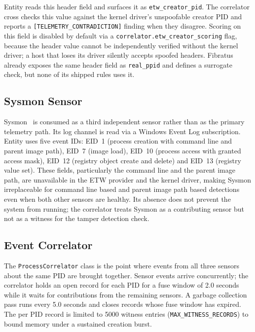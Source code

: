 \documentclass[10pt,twocolumn,letterpaper]{article}
\newcommand{\code}[1]{\texttt{\small #1}}
\begin{document}
Entity reads this header field and surfaces it as \code{etw\_creator\_pid}. The
correlator cross checks this value against the kernel driver's unspoofable creator PID
and reports a \code{[TELEMETRY\_CONTRADICTION]} finding when they disagree. Scoring on
this field is disabled by default via a \code{correlator.etw\_creator\_scoring} flag,
because the header value cannot be independently verified without the kernel driver; a
host that loses its driver silently accepts spoofed headers. Fibratus already exposes the
same header field as \code{real\_ppid} and defines a surrogate check, but none of its
shipped rules uses it.

\subsection{Sysmon Sensor}
\label{sec:sysmon}

Sysmon~\cite{sysmon} is consumed as a third independent sensor rather than as the primary
telemetry path. Its log channel is read via a Windows Event Log subscription. Entity uses
five event IDs: EID~1 (process creation with command line and parent image path), EID~7
(image load), EID~10 (process access with granted access mask), EID~12 (registry object
create and delete) and EID~13 (registry value set). These fields, particularly the command
line and the parent image path, are unavailable in the ETW provider and the kernel driver,
making Sysmon irreplaceable for command line based and parent image path based detections
even when both other sensors are healthy. Its absence does not prevent the system from
running; the correlator treats Sysmon as a contributing sensor but not as a witness for
the tamper detection check.

\subsection{Event Correlator}
\label{sec:corr}

The \code{ProcessCorrelator} class is the point where events from all three sensors
about the same PID are brought together. Sensor events arrive concurrently; the
correlator holds an open record for each PID for a fuse window of 2.0 seconds while it
waits for contributions from the remaining sensors. A garbage collection pass runs every
5.0 seconds and closes records whose fuse window has expired. The per PID record is
limited to 5000 witness entries (\code{MAX\_WITNESS\_RECORDS}) to bound memory under a
sustained creation burst.
\end{document}
